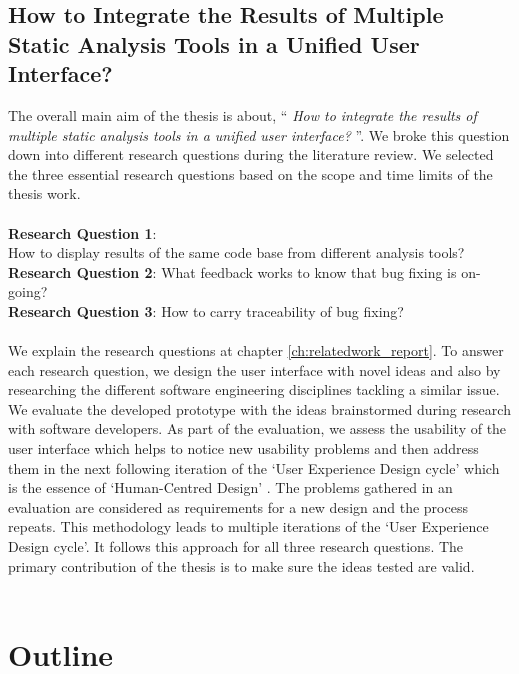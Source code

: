\subsection{How to Integrate the Results of Multiple Static Analysis Tools in a Unified User Interface?}

The overall main aim of the thesis is about, “ \textit{How to integrate the results of multiple static analysis tools in a unified user interface?} ”. We broke this question down into different research questions during the literature review. We selected the three essential research questions based on the scope and time limits of the thesis work. \\ \\

\noindent\textbf{Research Question 1}: \\ How to display results of the same code base from different analysis tools? \\
\textbf{Research Question 2}: What feedback works to know that bug fixing is on-going? \\
\textbf{Research Question 3}: How to carry traceability of bug fixing? \\ \\

We explain the research questions at chapter \ref{ch:relatedwork_report}. To answer each research question, we design the user interface with novel ideas and also by researching the different software engineering disciplines tackling a similar issue. We evaluate the developed prototype with the ideas brainstormed during research with software developers. As part of the evaluation, we assess the usability \cite{usability} of the user interface which helps to notice new usability problems and then address them in the next following iteration of the ‘User Experience Design cycle’ \cite{UXD} which is the essence of ‘Human-Centred Design’ \cite{hcd}. The problems gathered in an evaluation are considered as requirements for a new design and the process repeats. This methodology leads to multiple iterations of the ‘User Experience Design cycle’. It follows this approach for all three research questions. The primary contribution of the thesis is to make sure the ideas tested are valid. \\ \\



\section{Outline}


